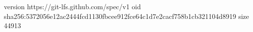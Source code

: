 version https://git-lfs.github.com/spec/v1
oid sha256:5372056e12ac2444fcd1130fbcee912fce64c1d7e2cacf758b1cb321104d8919
size 44913
